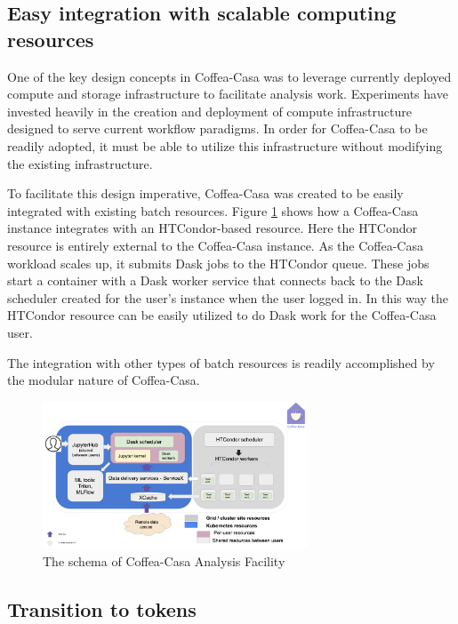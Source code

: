 \documentclass{webofc}
\begin{document}
\subsection{Easy integration with scalable computing resources
}
One of the key design concepts in Coffea-Casa was to leverage currently deployed compute and storage infrastructure to facilitate analysis work. Experiments have invested heavily in the creation and deployment of compute infrastructure designed to serve current workflow paradigms. In order for Coffea-Casa to be readily adopted, it must be able to utilize this infrastructure without modifying the existing infrastructure.  

To facilitate this design imperative, Coffea-Casa was created to be easily integrated with existing batch resources.  Figure \ref{fig-3} shows how a Coffea-Casa instance integrates with an HTCondor-based resource.  Here the HTCondor \cite{condor-practice} resource is entirely external to the Coffea-Casa instance.  As the Coffea-Casa workload scales up, it submits Dask \cite{dask} jobs to the HTCondor queue.  These jobs start a container with a Dask worker service that connects back to the Dask scheduler created for the user's instance when the user logged in.  In this way the HTCondor resource can be easily utilized to do Dask work for the Coffea-Casa user. 

The integration with other types of batch resources is readily accomplished by the modular nature of Coffea-Casa.

\begin{figure}
\centering
\sidecaption
\includegraphics[width=0.7\textwidth]{cc.png}
\caption{The schema of Coffea-Casa Analysis Facility}
\label{fig-3}       %
\end{figure}

\subsection{Transition to tokens}
\end{document}
